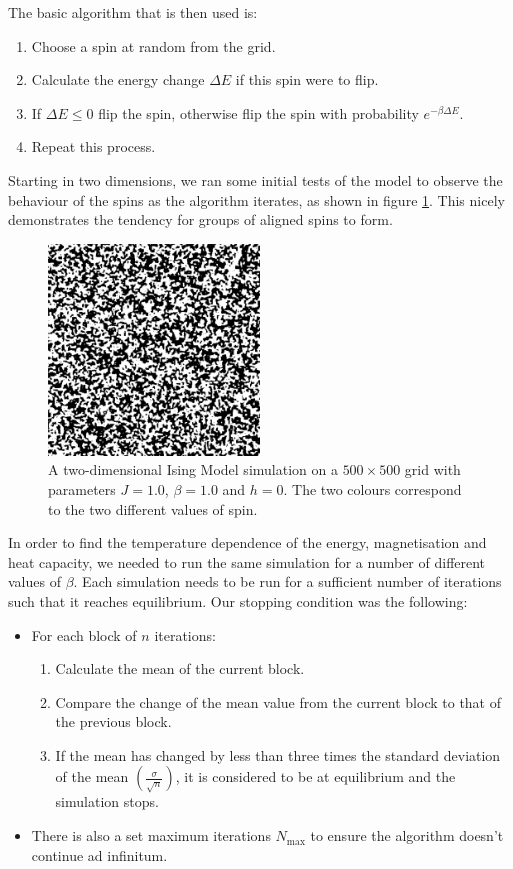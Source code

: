 \documentclass[11pt]{article}
\begin{document}
	The basic algorithm that is then used is:
	\begin{enumerate}
		\item Choose a spin at random from the grid.
		\item Calculate the energy change $\Delta E$ if this spin were to flip.
		\item If $\Delta E \leq 0$ flip the spin, otherwise flip the spin with probability $e^{-\beta\Delta E}$.
		\item Repeat this process.
	\end{enumerate}
	
	Starting in two dimensions, we ran some initial tests of the model to observe the behaviour of the spins as the algorithm iterates, as shown in figure \ref{fig:ising_grid}. This nicely demonstrates the tendency for groups of aligned spins to form.
	\begin{figure}[H]
		\begin{center}
			\includegraphics[width=0.5\textwidth]{./img/ising-simulation.png}
		\end{center}
		\caption{A two-dimensional Ising Model simulation on a $500\times 500$ grid with parameters $J = 1.0$, $\beta = 1.0$ and $h = 0$. The two colours correspond to the two different values of spin.}
		\label{fig:ising_grid}
	\end{figure}
	
	In order to find the temperature dependence of the energy, magnetisation and heat capacity, we needed to run the same simulation for a number of different values of $\beta$. Each simulation needs to be run for a sufficient number of iterations such that it reaches equilibrium. Our stopping condition was the following:
	\begin{itemize}
		\item For each block of $n$ iterations:
		\begin{enumerate}
			\item Calculate the mean of the current block.
			\item Compare the change of the mean value from the current block to that of the previous block.
			\item If the mean has changed by less than three times the standard deviation of the mean $\displaystyle\left(\frac{\sigma}{\sqrt{n}}\right)$, it is considered to be at equilibrium and the simulation stops.
		\end{enumerate}
		\item There is also a set maximum iterations $N_\text{max}$ to ensure the algorithm doesn't continue ad infinitum.
	\end{itemize}
\end{document}
